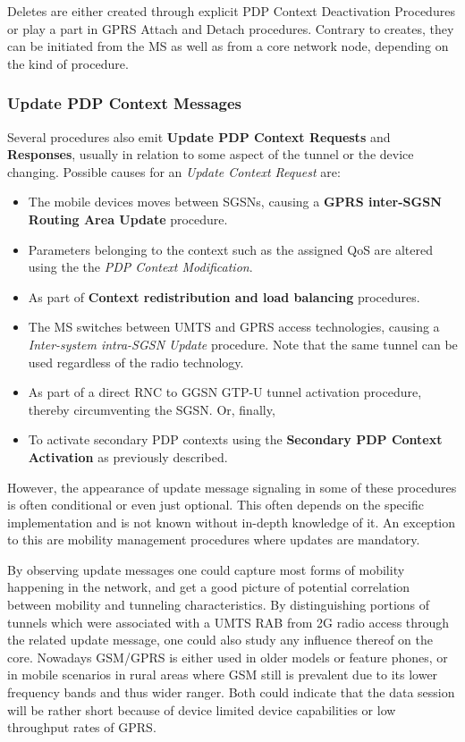 Deletes are either created through explicit \gls{PDP} Context Deactivation Procedures or play a part in \gls{GPRS} Attach and Detach procedures. Contrary to creates, they can be initiated from the \gls{MS} as well as from a core network node, depending on the kind of procedure.


\subsubsection{Update PDP Context Messages}

Several procedures also emit \textbf{Update \gls{PDP} Context Requests} and \textbf{Responses}, usually in relation to some aspect of the tunnel or the device changing. 
Possible causes for an \textit{Update Context Request} are:

\begin{itemize}
	\item The mobile devices moves between \glspl{SGSN}, causing a \textbf{\gls{GPRS} inter-\gls{SGSN} Routing Area Update} procedure.
	\item Parameters belonging to the context such as the assigned \gls{QoS} are altered using the the \textit{\gls{PDP} Context Modification}.
	\item As part of \textbf{Context redistribution and load balancing} procedures.
	\item The \gls{MS} switches between \gls{UMTS} and \gls{GPRS} access technologies, causing a \textit{Inter-system intra-\gls{SGSN} Update} procedure. Note that the same tunnel can be used regardless of the radio technology.
	\item As part of a direct \gls{RNC} to \gls{GGSN} \gls{GTP-U} tunnel activation procedure, thereby circumventing the \gls{SGSN}. Or, finally, 
	\item To activate secondary \gls{PDP} contexts using the \textbf{Secondary PDP Context Activation} as previously described. 
\end{itemize}

However, the appearance of update message signaling in some of these procedures is often conditional or even just optional. This often depends on the specific implementation and is not known without in-depth knowledge of it. An exception to this are mobility management procedures where updates are mandatory.

By observing update messages one could capture most forms of mobility happening in the network, and get a good picture of potential correlation between mobility and tunneling characteristics. 
By distinguishing portions of tunnels which were associated with a \gls{UMTS} \gls{RAB} from \gls{2G} radio access through the related update message, one could also study any influence thereof on the core.
Nowadays \gls{GSM}/\gls{GPRS} is either used in older models or feature phones, or in mobile scenarios in rural areas where \gls{GSM} still is prevalent due to its lower frequency bands and thus wider ranger. Both could indicate that the data session will be rather short because of device limited device capabilities or low throughput rates of \gls{GPRS}.



